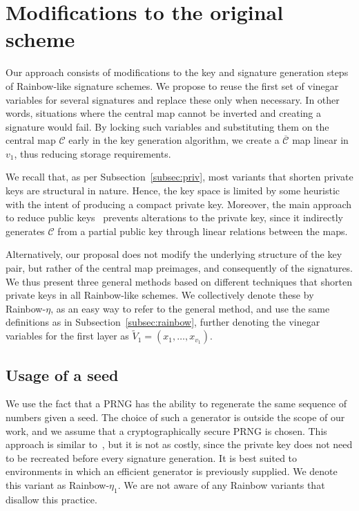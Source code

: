 \documentclass[12pt, a4paper, oneside]{memoir}
\theoremstyle{definition}
\begin{document}
\section{Modifications to the original scheme}\label{sec:eta}

Our approach consists of modifications to the key and signature generation steps of Rainbow-like signature schemes. We propose to reuse the first set of vinegar variables for several signatures and replace these only when necessary. In other words, situations where the central map cannot be inverted and creating a signature would fail. By locking such variables and substituting them on the central map $\mathcal{C}$ early in the key generation algorithm, we create a $\overline{\mathcal{C}}$ map linear in $v_{1}$, thus reducing storage requirements. 

We recall that, as per Subsection~\ref{subsec:priv}, most variants that shorten private keys are structural in nature. Hence, the key space is limited by some heuristic with the intent of producing a compact private key. Moreover, the main approach to reduce public keys~\cite{Petzoldt:201307} prevents alterations to the private key, since it indirectly generates $\mathcal{C}$ from a partial public key through linear relations between the maps. 

Alternatively, our proposal does not modify the underlying structure of the key pair, but rather of the central map preimages, and consequently of the signatures. We thus present three general methods based on different techniques that shorten private keys in all Rainbow-like schemes. We collectively denote these by Rainbow-$\eta$, as an easy way to refer to the general method, and use the same definitions as in Subsection~\ref{subsec:rainbow}, further denoting the vinegar variables for the first layer as $\widetilde{V}_{1} = (x_{1}, \dots, x_{v_{1}})$.

\subsection{Usage of a seed}

We use the fact that a PRNG has the ability to regenerate the same sequence of numbers given a seed. The choice of such a generator is outside the scope of our work, and we assume that a cryptographically secure PRNG is chosen. This approach is similar to~\cite{Shim:201512}, but it is not as costly, since the private key does not need to be recreated before every signature generation. It is best suited to environments in which an efficient generator is previously supplied. We denote this variant as Rainbow-$\eta_{1}$. We are not aware of any Rainbow variants that disallow this practice.
\end{document}
